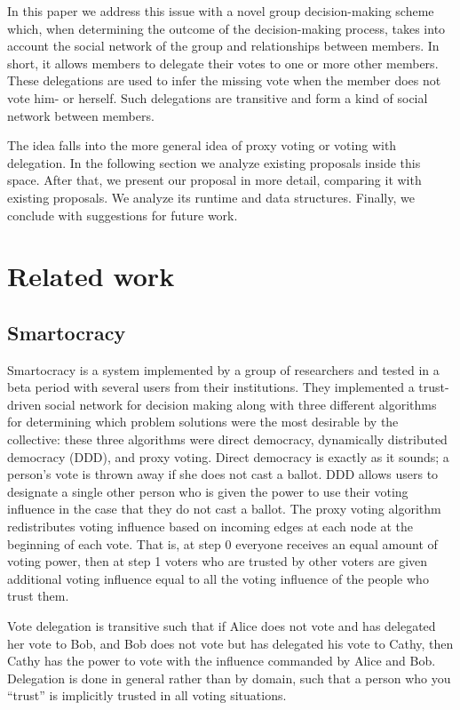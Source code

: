 \documentclass[a4paper]{acm_proc_article-sp}
\begin{document}
In this paper we address this issue with a novel group decision-making scheme which, when determining the outcome of
the decision-making process, takes into account the social network of the group and relationships between members.
In short, it allows members to delegate their votes to one or more other members. These delegations are used to infer
the missing vote when the member does not vote him- or herself. Such delegations are transitive and form a kind of
social network between members.

The idea falls into the more general idea of proxy voting or voting with delegation.  In the following section we
analyze existing proposals inside this space. After that, we present our proposal in more detail, comparing it with
existing proposals.  We analyze its runtime and data structures.  Finally, we conclude with suggestions for future work.

\section{Related work}

\subsection{Smartocracy}

Smartocracy \cite{smartocracy} is a system implemented by a group of researchers and tested in a beta period with several users from their
institutions.  They implemented a trust-driven social network for decision making along with three different algorithms
for determining which problem solutions were the most desirable by the collective: these three algorithms were direct
democracy, dynamically distributed democracy (DDD), and proxy voting.  Direct democracy is exactly as it sounds;
a person's vote is thrown away if she does not cast a ballot.  DDD allows users to designate a single other person
who is given the power to use their voting influence in the case that they do not cast a ballot.  The proxy voting
algorithm redistributes voting influence based on incoming edges at each node at the beginning of each vote.  That
is, at step 0 everyone receives an equal amount of voting power, then at step 1 voters who are trusted by other
voters are given additional voting influence equal to all the voting influence of the people who trust them.

Vote delegation is transitive such that if Alice does not vote and has delegated her vote to Bob, and Bob does not
vote but has delegated his vote to Cathy, then Cathy has the power to vote with the influence commanded by Alice and Bob.
Delegation is done in general rather than by domain, such that a person who you ``trust'' is implicitly trusted in all
voting situations.
\end{document}

